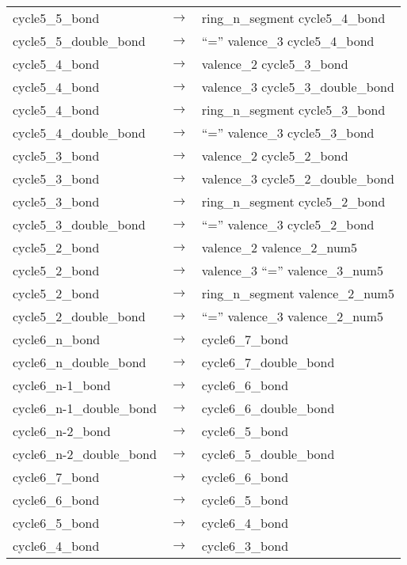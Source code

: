 \begin{longtable}{m{} p{} p{}}
    cycle5\_5\_bond & $\rightarrow$ & ring\_n\_segment cycle5\_4\_bond \\
    cycle5\_5\_double\_bond & $\rightarrow$ & ``='' valence\_3 cycle5\_4\_bond \\
    cycle5\_4\_bond & $\rightarrow$ & valence\_2 cycle5\_3\_bond \\
    cycle5\_4\_bond & $\rightarrow$ & valence\_3 cycle5\_3\_double\_bond \\
    cycle5\_4\_bond & $\rightarrow$ & ring\_n\_segment cycle5\_3\_bond \\
    cycle5\_4\_double\_bond & $\rightarrow$ & ``='' valence\_3 cycle5\_3\_bond \\
    cycle5\_3\_bond & $\rightarrow$ & valence\_2 cycle5\_2\_bond \\
    cycle5\_3\_bond & $\rightarrow$ & valence\_3 cycle5\_2\_double\_bond \\
    cycle5\_3\_bond & $\rightarrow$ & ring\_n\_segment cycle5\_2\_bond \\
    cycle5\_3\_double\_bond & $\rightarrow$ & ``='' valence\_3 cycle5\_2\_bond \\
    cycle5\_2\_bond & $\rightarrow$ & valence\_2 valence\_2\_num5 \\
    cycle5\_2\_bond & $\rightarrow$ & valence\_3 ``='' valence\_3\_num5 \\
    cycle5\_2\_bond & $\rightarrow$ & ring\_n\_segment valence\_2\_num5 \\
    cycle5\_2\_double\_bond & $\rightarrow$ & ``='' valence\_3 valence\_2\_num5 \\
    cycle6\_n\_bond & $\rightarrow$ & cycle6\_7\_bond \\
    cycle6\_n\_double\_bond & $\rightarrow$ & cycle6\_7\_double\_bond \\
    cycle6\_n-1\_bond & $\rightarrow$ & cycle6\_6\_bond \\
    cycle6\_n-1\_double\_bond & $\rightarrow$ & cycle6\_6\_double\_bond \\
    cycle6\_n-2\_bond & $\rightarrow$ & cycle6\_5\_bond \\
    cycle6\_n-2\_double\_bond & $\rightarrow$ & cycle6\_5\_double\_bond \\
    cycle6\_7\_bond & $\rightarrow$ & cycle6\_6\_bond \\
    cycle6\_6\_bond & $\rightarrow$ & cycle6\_5\_bond \\
    cycle6\_5\_bond & $\rightarrow$ & cycle6\_4\_bond \\
    cycle6\_4\_bond & $\rightarrow$ & cycle6\_3\_bond \\

\end{longtable}
